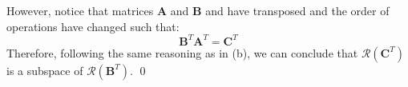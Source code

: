 \begin{enumerate}[label=(\alph*)]
	      However, notice that matrices
	      $\mathbf{A}$ and $\mathbf{B}$ and have transposed and the order of
	      operations have changed such that:
	      $$ \mathbf{B}^T \mathbf{A}^T = \mathbf{C}^T $$
	      Therefore, following the same reasoning as in (b), we can conclude
	      that $\mathcal{R}\left( \mathbf{C}^T \right)$ is a subspace of
	      $\mathcal{R}\left(\mathbf{B}^T \right)$. \qed

\end{enumerate}
